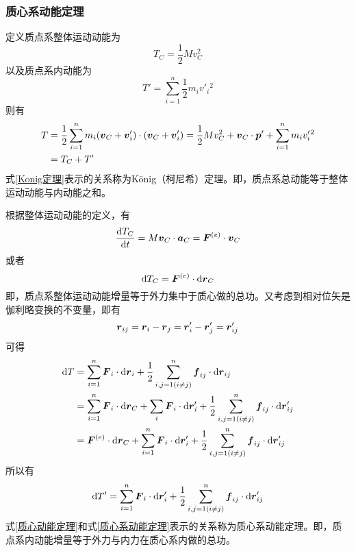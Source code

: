 \subsubsection{质心系动能定理}

定义{\heiti 质点系整体运动动能}为
\begin{equation}
	T_C = \frac12 M v_C^2
\end{equation}
以及{\heiti 质点系内动能}为
\begin{equation}
	T' = \sum_{i=1}^n \frac12 m_i v'_i{}^2
\end{equation}
则有
\begin{align}
	T & = \frac12 \sum_{i=1}^n m_i(\boldsymbol{v}_C + \boldsymbol{v}'_i) \cdot (\boldsymbol{v}_C + \boldsymbol{v}'_i) = \frac12 M v_C^2 + \boldsymbol{v}_C \cdot \boldsymbol{p}' + \sum_{i=1}^n m_i v'_i{}^2 \nonumber \\
	& = T_C + T' \label{Konig定理}
\end{align}
式\eqref{Konig定理}表示的关系称为{\heiti K\"onig（柯尼希）定理}。即，质点系总动能等于整体运动动能与内动能之和。

根据整体运动动能的定义，有
\begin{equation}
	\frac{\mathrm{d} T_C}{\mathrm{d} t} = M\boldsymbol{v}_C \cdot \boldsymbol{a}_C = \boldsymbol{F}^{(e)} \cdot \boldsymbol{v}_C
\end{equation}
或者
\begin{equation}
	\mathrm{d}T_C = \boldsymbol{F}^{(e)} \cdot \mathrm{d} \boldsymbol{r}_C
	\label{质心动能定理}
\end{equation}
即，质点系整体运动动能增量等于外力集中于质心做的总功。又考虑到相对位矢是伽利略变换的不变量，即有
\begin{equation*}
	\boldsymbol{r}_{ij} = \boldsymbol{r}_i - \boldsymbol{r}_j = \boldsymbol{r}'_i - \boldsymbol{r}'_j = \boldsymbol{r}'_{ij}
\end{equation*}
可得
\begin{align*}
	\mathrm{d} T & = \sum_{i=1}^n \boldsymbol{F}_i \cdot \mathrm{d} \boldsymbol{r}_i + \frac12 \sum_{i,j=1(i\neq j)}^n \boldsymbol{f}_{ij} \cdot \mathrm{d} \boldsymbol{r}_{ij} \\
	& = \sum_{i=1}^n \boldsymbol{F}_i \cdot \mathrm{d} \boldsymbol{r}_C + \sum_i \boldsymbol{F}_i \cdot \mathrm{d} \boldsymbol{r}'_i + \frac12 \sum_{i,j=1(i\neq j)}^n \boldsymbol{f}_{ij} \cdot \mathrm{d} \boldsymbol{r}'_{ij} \\
	& = \boldsymbol{F}^{(e)} \cdot \mathrm{d} \boldsymbol{r}_C + \sum_{i=1}^n \boldsymbol{F}_i \cdot \mathrm{d} \boldsymbol{r}'_i + \frac12 \sum_{i,j=1(i \neq j)}^n \boldsymbol{f}_{ij} \cdot \mathrm{d} \boldsymbol{r}'_{ij}
\end{align*}
所以有
\begin{equation}
	\mathrm{d} T' = \sum_{i=1}^n \boldsymbol{F}_i \cdot \mathrm{d} \boldsymbol{r}'_i + \frac12 \sum_{i,j=1(i \neq j)}^n \boldsymbol{f}_{ij} \cdot \mathrm{d} \boldsymbol{r}'_{ij}
	\label{质心系动能定理}
\end{equation}
式\eqref{质心动能定理}和式\eqref{质心系动能定理}表示的关系称为{\heiti 质心系动能定理}。即，质点系内动能增量等于外力与内力在质心系内做的总功。

